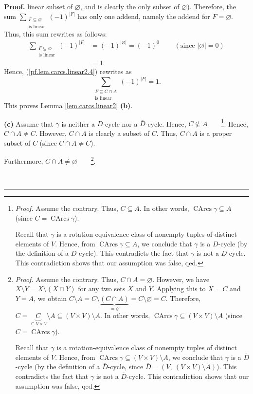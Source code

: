 \documentclass[numbers=enddot,12pt,final,onecolumn,notitlepage]{scrartcl}%
\numberwithin{exer}{section}
\theoremstyle{definition}
\newenvironment{proof}[1][Proof]{\noindent\textbf{#1.} }{\ \rule{0.5em}{0.5em}}
\let\sumnonlimits\sum
\renewcommand{\sum}{\sumnonlimits\limits}
\newenvironment{verlong}{}{}
\begin{document}
\begin{verlong}
\begin{proof}
linear subset of $\varnothing$, and is clearly the only subset of
$\varnothing$). Therefore, the sum $\sum_{\substack{F\subseteq\varnothing
\\\text{is linear}}}\left(  -1\right)  ^{\left\vert F\right\vert }$ has only
one addend, namely the addend for $F=\varnothing$. Thus, this sum rewrites as
follows:%
\begin{align*}
\sum_{\substack{F\subseteq\varnothing\\\text{is linear}}}\left(  -1\right)
^{\left\vert F\right\vert }  &  =\left(  -1\right)  ^{\left\vert
\varnothing\right\vert }=\left(  -1\right)  ^{0}\ \ \ \ \ \ \ \ \ \ \left(
\text{since }\left\vert \varnothing\right\vert =0\right) \\
&  =1.
\end{align*}
Hence, (\ref{pf.lem.carcs.linear2.4}) rewrites as%
\[
\sum_{\substack{F\subseteq C\cap A\\\text{is linear}}}\left(  -1\right)
^{\left\vert F\right\vert }=1.
\]
This proves Lemma \ref{lem.carcs.linear2} \textbf{(b)}. \medskip

\textbf{(c)} Assume that $\gamma$ is neither a $D$-cycle nor a $\overline{D}%
$-cycle. Hence, $C\not \subseteq A$\ \ \ \ \footnote{\textit{Proof.} Assume
the contrary. Thus, $C\subseteq A$. In other words, $\operatorname*{CArcs}%
\gamma\subseteq A$ (since $C=\operatorname*{CArcs}\gamma$).
\par
Recall that $\gamma$ is a rotation-equivalence class of nonempty tuples of
distinct elements of $V$. Hence, from $\operatorname*{CArcs}\gamma\subseteq
A$, we conclude that $\gamma$ is a $D$-cycle (by the definition of a
$D$-cycle). This contradicts the fact that $\gamma$ is not a $D$-cycle. This
contradiction shows that our assumption was false, qed.}. Hence, $C\cap A\neq
C$. However, $C\cap A$ is clearly a subset of $C$. Thus, $C\cap A$ is a proper
subset of $C$ (since $C\cap A\neq C$).

Furthermore, $C\cap A\neq\varnothing$\ \ \ \ \footnote{\textit{Proof.} Assume
the contrary. Thus, $C\cap A=\varnothing$. However, we have $X\setminus
Y=X\setminus\left(  X\cap Y\right)  $ for any two sets $X$ and $Y$. Applying
this to $X=C$ and $Y=A$, we obtain $C\setminus A=C\setminus\underbrace{\left(
C\cap A\right)  }_{=\varnothing}=C\setminus\varnothing=C$. Therefore,
$C=\underbrace{C}_{\subseteq V\times V}\setminus A\subseteq\left(  V\times
V\right)  \setminus A$. In other words, $\operatorname*{CArcs}\gamma
\subseteq\left(  V\times V\right)  \setminus A$ (since
$C=\operatorname*{CArcs}\gamma$).
\par
Recall that $\gamma$ is a rotation-equivalence class of nonempty tuples of
distinct elements of $V$. Hence, from $\operatorname*{CArcs}\gamma
\subseteq\left(  V\times V\right)  \setminus A$, we conclude that $\gamma$ is
a $\overline{D}$-cycle (by the definition of a $\overline{D}$-cycle, since
$\overline{D}=\left(  V,\ \left(  V\times V\right)  \setminus A\right)  $).
This contradicts the fact that $\gamma$ is not a $\overline{D}$-cycle. This
contradiction shows that our assumption was false, qed.}.


\end{proof}
\end{verlong}
\end{document}
